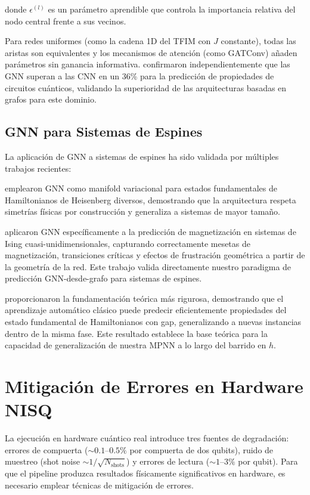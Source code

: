 \documentclass[11pt,a4paper,spanish]{book}
\begin{document}
\noindent donde $\epsilon^{(l)}$ es un parámetro aprendible que controla la importancia relativa del nodo central frente a sus vecinos.

Para redes uniformes (como la cadena 1D del TFIM con $J$ constante), todas las aristas son equivalentes y los mecanismos de atención (como GATConv) añaden parámetros sin ganancia informativa. \citet{meng2025} confirmaron independientemente que las GNN superan a las CNN en un 36\% para la predicción de propiedades de circuitos cuánticos, validando la superioridad de las arquitecturas basadas en grafos para este dominio.

\subsection{GNN para Sistemas de Espines}

La aplicación de GNN a sistemas de espines ha sido validada por múltiples trabajos recientes:

\citet{kochkov2021} emplearon GNN como manifold variacional para estados fundamentales de Hamiltonianos de Heisenberg diversos, demostrando que la arquitectura respeta simetrías físicas por construcción y generaliza a sistemas de mayor tamaño.

\citet{slavin2025} aplicaron GNN específicamente a la predicción de magnetización en sistemas de Ising cuasi-unidimensionales, capturando correctamente mesetas de magnetización, transiciones críticas y efectos de frustración geométrica a partir de la geometría de la red. Este trabajo valida directamente nuestro paradigma de predicción GNN-desde-grafo para sistemas de espines.

\citet{huang2022} proporcionaron la fundamentación teórica más rigurosa, demostrando que el aprendizaje automático clásico puede predecir eficientemente propiedades del estado fundamental de Hamiltonianos con gap, generalizando a nuevas instancias dentro de la misma fase. Este resultado establece la base teórica para la capacidad de generalización de nuestra MPNN a lo largo del barrido en $h$.

\section{Mitigación de Errores en Hardware NISQ}

La ejecución en hardware cuántico real introduce tres fuentes de degradación: errores de compuerta ($\sim 0.1$--$0.5\%$ por compuerta de dos qubits), ruido de muestreo (shot noise $\sim 1/\sqrt{N_{\text{shots}}}$) y errores de lectura ($\sim 1$--$3\%$ por qubit). Para que el pipeline produzca resultados físicamente significativos en hardware, es necesario emplear técnicas de mitigación de errores.
\end{document}
